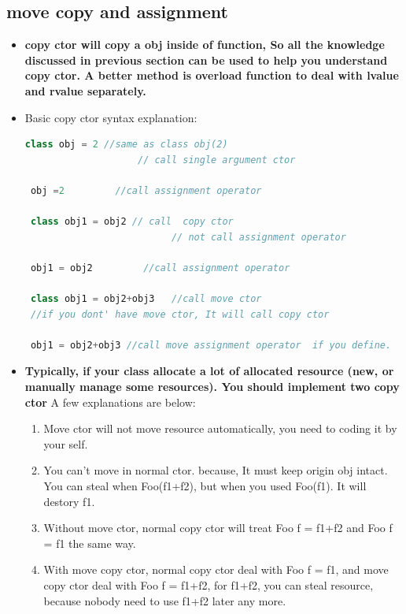 \documentclass[a4paper,12pt,twoside]{book}
\begin{document}
\subsection{move copy and assignment }
\begin{itemize}
\item \textbf{copy ctor will copy a obj inside of function, So all the knowledge discussed in previous section can be used to help you understand copy ctor. A better method is overload function to deal with lvalue and rvalue separately. }

\item Basic copy ctor syntax explanation:
 \begin{lstlisting}[frame=single, language=c++]
 class obj = 2 //same as class obj(2)
                    // call single argument ctor

 obj =2         //call assignment operator

 class obj1 = obj2 // call  copy ctor
                          // not call assignment operator

 obj1 = obj2         //call assignment operator

 class obj1 = obj2+obj3   //call move ctor
 //if you dont' have move ctor, It will call copy ctor

 obj1 = obj2+obj3 //call move assignment operator  if you define.
\end{lstlisting}


\item \textbf{Typically, if your class allocate a lot of allocated resource (new, or manually manage some resources).  You should implement two copy ctor} A few explanations are below:

\begin{enumerate}
\item Move ctor will not move resource automatically, you need to coding it by your self.

\item You can't move in normal ctor. because, It must keep origin obj intact.  You can steal when Foo(f1+f2), but when you used Foo(f1).  It will destory f1.

\item Without  move ctor, normal copy ctor will treat Foo f = f1+f2 and Foo f = f1 the same way.

\item With move copy ctor, normal copy ctor deal with Foo f = f1, and move copy ctor deal with Foo f = f1+f2, for f1+f2, you can steal resource, because nobody need to use f1+f2 later any more.


\end{enumerate}
\end{itemize}
\end{document}
